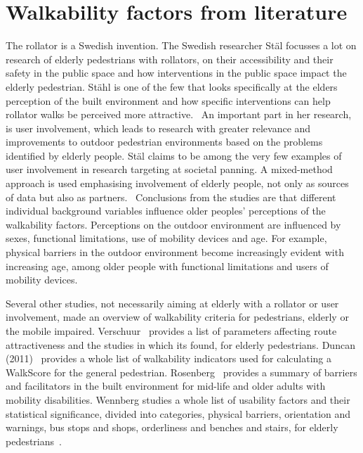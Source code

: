 \section{Walkability factors from literature}\label{Bliterature}
The rollator is a Swedish invention. The Swedish researcher St\"al focusses a lot on research of elderly pedestrians with rollators, on their accessibility and their safety in the public space and how interventions in the public space impact the elderly pedestrian. St\"ahl is one of the few that looks specifically at the elders perception of the built environment and how specific interventions can help rollator walks be perceived more attractive.~\cite{Stahl2008, Stahl2013} An important part in her research, is user involvement, which leads to research with greater relevance and improvements to outdoor pedestrian environments based on the problems identified by elderly people. St\"al claims to be among the very few examples of user involvement in research targeting at societal panning. A mixed-method approach is used emphasising involvement of elderly people, not only as sources of data but also as partners.~\cite{Stahl2008} Conclusions from the studies are that different individual background variables influence older peoples' perceptions of the walkability factors. Perceptions on the outdoor environment are influenced by sexes, functional limitations, use of mobility devices and age. For example, physical barriers in the outdoor environment become increasingly evident with increasing age, among older people with functional limitations and users of mobility devices.~\cite{Stahl2013, Wennberg2009}



Several other studies, not necessarily aiming at elderly with a rollator or user involvement, made an overview of walkability criteria for pedestrians, elderly or the mobile impaired. Verschuur~\cite{Verschuur2013} provides a list of parameters affecting route attractiveness and the studies in which its found, for elderly pedestrians. Duncan (2011)~\cite{Duncan2011} provides a whole list of walkability indicators used for calculating a WalkScore for the general pedestrian. Rosenberg~\cite{Rosenberg2012} provides a summary of barriers and facilitators in the built environment for mid-life and older adults with mobility disabilities. Wennberg studies a whole list of usability factors and their statistical significance, divided into categories, physical barriers, orientation and warnings, bus stops and shops, orderliness and benches and stairs, for elderly pedestrians~\cite{Wennberg2009}. 

